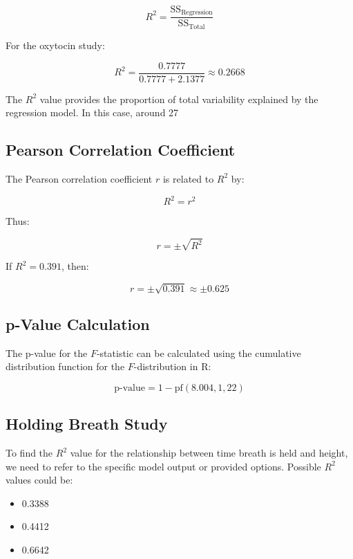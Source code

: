\documentclass{article}
\begin{document}
\[
R^2 = \frac{\text{SS}_\text{Regression}}{\text{SS}_\text{Total}}
\]

For the oxytocin study:

\[
R^2 = \frac{0.7777}{0.7777 + 2.1377} \approx 0.2668
\]

The \( R^2 \) value provides the proportion of total variability explained by the regression model. In this case, around 27%

\subsection{Pearson Correlation Coefficient}

The Pearson correlation coefficient \( r \) is related to \( R^2 \) by:

\[
R^2 = r^2
\]

Thus:

\[
r = \pm \sqrt{R^2}
\]

If \( R^2 = 0.391 \), then:

\[
r = \pm \sqrt{0.391} \approx \pm 0.625
\]

\subsection{p-Value Calculation}

The p-value for the \( F \)-statistic can be calculated using the cumulative distribution function for the \( F \)-distribution in R:

\[
\text{p-value} = 1 - \text{pf}(8.004, 1, 22)
\]

\subsection{Holding Breath Study}

To find the \( R^2 \) value for the relationship between time breath is held and height, we need to refer to the specific model output or provided options. Possible \( R^2 \) values could be:

\begin{itemize}
    \item 0.3388
    \item 0.4412
    \item 0.6642
\end{itemize}
\end{document}
